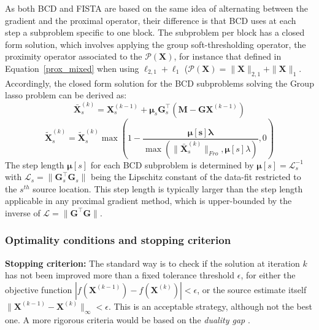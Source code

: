 As both BCD and FISTA are based on the same idea of alternating between the gradient and the proximal operator, their difference is that BCD uses at each step a subproblem specific to one block. The subproblem per block has a closed form solution, which involves applying the group soft-thresholding operator, the proximity operator associated to the $\mathcal{P}(\mathbf{X})$, for instance that defined in Equation~\ref{prox_mixed} when using $\ell_{2,1}+\ell_1$ ($\mathcal{P}(\mathbf{X}) = \|\mathbf{X}\|_{2,1}+\|\mathbf{X}\|_1$. Accordingly, the closed form solution for the BCD subproblems solving the Group \ac{lasso} problem can be derived as:
\begin{equation*} \label{eq_bcd_glasso}
\bar{\mathbf{X}}_s^{(k)} = \mathbf{X}_s^{(k-1)}+\mathbf{\mu}_s\mathbf{G}^\top_s(\mathbf{M} - \mathbf{GX}^{(k-1)})
\end{equation*}
\begin{equation}
\tilde{\mathbf{X}}_s^{(k)} = \tilde{\mathbf{X}}_s^{(k)}\max(1-\frac{\mathbf{\mu[s]\lambda}}{\max(\|\bar{\mathbf{X}}_s^{(k)}\|_{Fro}, \mathbf{\mu}[s]\lambda)}, 0)
\end{equation}
The step length $\mathbf{\mu}[s]$ for each BCD subproblem is determined by $\mathbf{\mu}[s]=\mathcal{L}_s^{-1}$ with $\mathcal{L}_s=\|\mathbf{G}_s^\top\mathbf{G}_s\|$ being the Lipschitz constant of the data-fit restricted to the $s^{th}$ source location. This step length is typically larger than the step length applicable in any proximal gradient method, which is upper-bounded by the inverse of $\mathcal{L} = \|\mathbf{G}^\top\mathbf{G}\|$.

\subsubsection*{Optimality conditions and stopping criterion}\label{section:duality_gap}

\textbf{Stopping criterion:} The standard way is to check if the solution at iteration $k$ has not been improved more than a fixed tolerance threshold $\epsilon$, for either the objective function $|f(\mathbf{X}^{(k-1)})-f(\mathbf{X}^{(k)})|<\epsilon$, or the source estimate itself $\|\mathbf{X}^{(k-1)}-\mathbf{X}^{(k)}\|_{\infty}<\epsilon$. This is an acceptable strategy, although not the best one. A more rigorous criteria would be based on the \textit{duality gap} \cite{boyd2004convex,bach2012optimization}.\\

